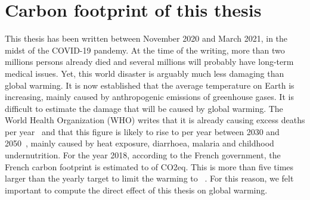     \lipsum[1]

\chapter{Carbon footprint of this thesis}
\label{chapter:carbon}

    This thesis has been written between November 2020 and March 2021, in the midst of the COVID-19 pandemy. At the time
    of the writing, more than two millions persons already died and several millions will probably have long-term
    medical issues. Yet, this world disaster is arguably much less damaging than global warming. It is now established
    that the average temperature on Earth is increasing, mainly caused by anthropogenic emissions of greenhouse gases.
    It is difficult to estimate the damage that will be caused by global warming. The World Health Organization (WHO)
    writes that it is already causing  excess deaths per year~\cite{who_globalwarming_current} and that this
    figure is likely to rise to  per year between 2030 and 2050~\cite{who_globalwarming_future}, mainly
    caused by heat exposure, diarrhoea, malaria and childhood undernutrition.  For the year 2018, according to the
    French government, the French carbon footprint is estimated to  of CO2eq.  This is more than five
    times larger than the yearly  target to limit the warming to ~\cite{co2_gouv}.  For
    this reason, we felt important to compute the direct effect of this thesis on global warming.
